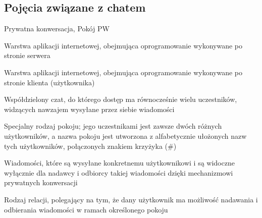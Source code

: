 \subsection{Pojęcia związane z chatem}
\label{slownik_pojec_chatu}

\begin{labeling}{Prywatna konwersacja, Pokój PW}
		\item[Backend] Warstwa aplikacji internetowej, obejmująca oprogramowanie wykonywane
				po stronie serwera
		\item[Frontend] Warstwa aplikacji internetowej, obejmująca oprogramowanie wykonywane
				po stronie klienta (użytkownika)
    \item[Pokój] Współdzielony czat, do którego dostęp ma równocześnie wielu uczestników, widzących nawzajem
        wysyłane przez siebie wiadomości
		\item[Prywatna konwersacja, Pokój PW] Specjalny rodzaj pokoju; jego uczestnikami jest zawsze dwóch różnych użytkowników, a
				nazwa pokoju jest utworzona z alfabetycznie ułożonych nazw tych użytkowników, połączonych znakiem krzyżyka (\#)
    \item[Wiadomości prywatne] Wiadomości, które są wysyłane konkretnemu użytkownikowi i są widoczne wyłącznie
        dla nadawcy i odbiorcy takiej wiadomości dzięki mechanizmowi prywatnych konwersacji
    \item[Wpięcie użytkownika w pokój] Rodzaj relacji, polegający na tym, że dany użytkownik ma możliwość
        nadawania i odbierania wiadomości w ramach określonego pokoju
\end{labeling}
